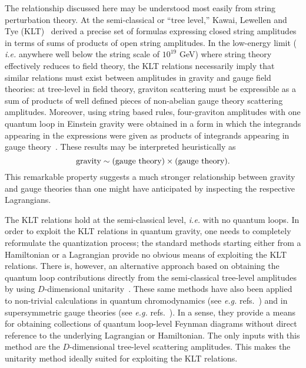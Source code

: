 The relationship discussed here may be understood most easily from
string perturbation theory.  At the semi-classical or ``tree level,''
Kawai, Lewellen and Tye (KLT)~\cite{KLT} derived a precise set of
formulas expressing closed string amplitudes in terms of sums of
products of open string amplitudes.  In the low-energy limit ({\it
i.e.} anywhere well below the string scale of $10^{19}$ GeV) where
string theory effectively reduces to field theory, the KLT relations
necessarily imply that similar relations must exist between amplitudes in
gravity and gauge field theories: at tree-level in field theory, graviton
scattering must be expressible as a sum of products of well defined
pieces of non-abelian gauge theory scattering amplitudes.  Moreover,
using string based rules, four-graviton amplitudes with one quantum
loop in Einstein gravity were obtained in a form in which the integrands
appearing in the expressions were given as products of integrands
appearing in gauge theory~\cite{BDS,DunbarNorridge95}.  These results may
be interpreted heuristically as
%
\begin{equation}
\hbox{gravity} \sim \hbox{(gauge theory)} \times  \hbox{(gauge theory)}.
\label{HeuristicFormula}
\end{equation}
%
This remarkable property suggests a much stronger relationship between
gravity and gauge theories than one might have anticipated by
inspecting the respective Lagrangians.

The KLT relations hold at the semi-classical level, {\it i.e.} with no
quantum loops.  In order to exploit the KLT relations in quantum
gravity, one needs to completely reformulate the quantization process;
the standard methods starting either from a Hamiltonian or a
Lagrangian provide no obvious means of exploiting the KLT relations.
There is, however, an alternative approach based on obtaining the
quantum loop contributions directly from the semi-classical tree-level
amplitudes by using $D$-dimensional
unitarity~\cite{Bern94SusyFour,Bern95SusyFour,BernMorgan,Review,Rozowsky}.
These same methods have also been applied to non-trivial calculations
in quantum chromodynamics (see {\it e.g.}
refs.~\cite{BernMorgan,Bern00QCDApplications,Bern02QCDApplications})
 and in supersymmetric gauge
theories (see {\it e.g.}
refs.~\cite{Bern94SusyFour,Bern95SusyFour,BRY,BDDPR}).  In a sense,
they provide a means for obtaining collections of quantum loop-level
Feynman diagrams without direct reference to the underlying Lagrangian
or Hamiltonian.  The only inputs with this method are the
$D$-dimensional tree-level scattering amplitudes.  This makes the
unitarity method ideally suited for exploiting the KLT relations.

